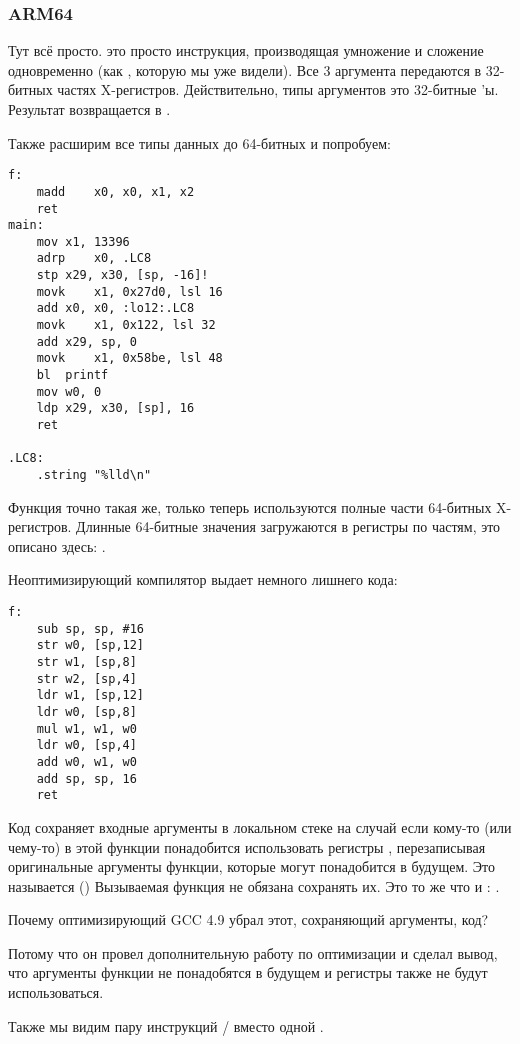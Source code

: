\subsubsection{ARM64}


Тут всё просто.
 это просто инструкция, производящая умножение и сложение одновременно (как , 
которую мы уже видели).
Все 3 аргумента передаются в 32-битных частях X-регистров.
Действительно, типы аргументов это 32-битные 'ы.
Результат возвращается в .



Также расширим все типы данных до 64-битных  и попробуем:



\begin{lstlisting}
f:
	madd	x0, x0, x1, x2
	ret
main:
	mov	x1, 13396
	adrp	x0, .LC8
	stp	x29, x30, [sp, -16]!
	movk	x1, 0x27d0, lsl 16
	add	x0, x0, :lo12:.LC8
	movk	x1, 0x122, lsl 32
	add	x29, sp, 0
	movk	x1, 0x58be, lsl 48
	bl	printf
	mov	w0, 0
	ldp	x29, x30, [sp], 16
	ret

.LC8:
	.string	"%lld\n"
\end{lstlisting}

Функция \ttf{} точно такая же, только теперь используются полные части 64-битных X-регистров.
Длинные 64-битные значения загружаются в регистры по частям, это описано здесь: .


Неоптимизирующий компилятор выдает немного лишнего кода:

\begin{lstlisting}
f:
	sub	sp, sp, #16
	str	w0, [sp,12]
	str	w1, [sp,8]
	str	w2, [sp,4]
	ldr	w1, [sp,12]
	ldr	w0, [sp,8]
	mul	w1, w1, w0
	ldr	w0, [sp,4]
	add	w0, w1, w0
	add	sp, sp, 16
	ret
\end{lstlisting}

Код сохраняет входные аргументы в локальном стеке на случай если кому-то (или чему-то) в этой функции
понадобится использовать регистры , перезаписывая оригинальные аргументы функции, которые
могут понадобится в будущем.
Это называется  (\ARMPCS)
Вызываемая функция не обязана сохранять их.
Это то же что и : .

Почему оптимизирующий GCC 4.9 убрал этот, сохраняющий аргументы, код?

Потому что он провел дополнительную работу по оптимизации и сделал вывод, 
что аргументы функции не понадобятся в будущем и регистры  также не будут использоваться.

Также мы видим пару инструкций / вместо одной .

